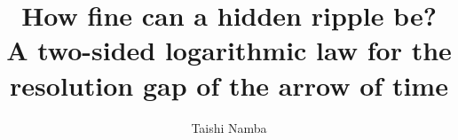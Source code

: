 \documentclass[aps,pre,twocolumn,superscriptaddress,nofootinbib]{revtex4-2}
\begin{document}
\title{\texorpdfstring{How fine can a hidden ripple be?\\ A two-sided logarithmic law for the resolution gap of the arrow of time}{How fine can a hidden ripple be? A two-sided logarithmic law for the resolution gap of the arrow of time}}

\author{Taishi Namba}

\begin{abstract}

\end{abstract}

\maketitle











\appendix









\end{document}
